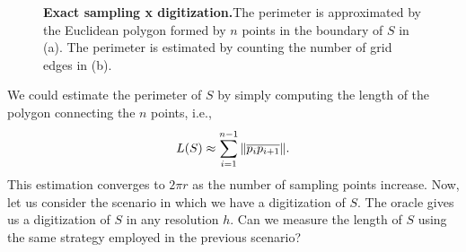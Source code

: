 \begin{figure}
{}\hspace{1em}
\caption{\textbf{Exact sampling x digitization.}The perimeter is approximated by the Euclidean polygon formed by $n$ points in the boundary of $S$ in (a). The perimeter is estimated by counting the number of grid edges in (b).}
\label{ch4:fig:exact-sampling-digitization}
\end{figure}

We could estimate the perimeter of $S$ by simply computing the length of the polygon  connecting the $n$ points, i.e., 
\begin{align*}
	L(S) \approx \sum_{i=1}^{n-1}{ \lVert \overline{p_ip_{i+1}} \rVert}.
\end{align*}
This estimation converges to $2\pi r$ as the number of sampling points increase. Now, let us consider the scenario in which we have a digitization of $S$. The oracle gives us a digitization of $S$ in any resolution $h$. Can we measure the length of $S$ using the same strategy employed in the previous scenario?

